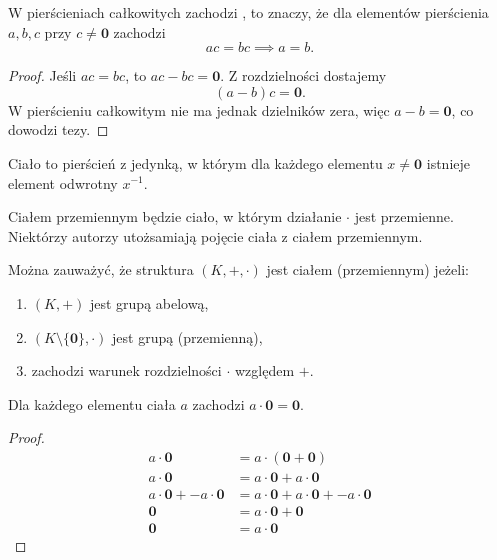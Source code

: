 \begin{lemma}
    \label{l:cancellation_property}
    W pierścieniach całkowitych zachodzi , to znaczy, że dla elementów pierścienia $a, b, c$ przy $c \neq \mathbf{0}$ zachodzi
    $$ ac = bc \implies a = b. $$
\end{lemma}
\begin{proof}
    Jeśli $ac = bc$, to $ac - bc = \mathbf{0}$. Z rozdzielności dostajemy
    $$ (a - b)c = \mathbf{0}. $$
    W pierścieniu całkowitym nie ma jednak dzielników zera, więc $a - b = \mathbf{0}$, co dowodzi tezy.
\end{proof}

\begin{definition}
    Ciało to pierścień z jedynką, w którym dla każdego elementu $x \neq \mathbf{0}$ istnieje element odwrotny $x^{-1}$.
\end{definition}

Ciałem przemiennym będzie ciało, w którym działanie $\cdot$ jest przemienne. Niektórzy autorzy utożsamiają pojęcie ciała z ciałem przemiennym.

Można zauważyć, że struktura $(K, +, \cdot)$ jest ciałem (przemiennym) jeżeli:
\begin{enumerate}
    \item $(K, +)$ jest grupą abelową,
    \item $(K \setminus \{\mathbf{0}\}, \cdot)$ jest grupą (przemienną),
    \item zachodzi warunek rozdzielności $\cdot$ względem $+$.
\end{enumerate}

\begin{lemma}
    \label{l:a0=0}
    Dla każdego elementu ciała $a$ zachodzi $a \cdot \mathbf{0} = \mathbf{0}$.
\end{lemma}
\begin{proof}
    \begin{align*}             a \cdot \mathbf{0} &= a \cdot (\mathbf{0} + \mathbf{0}) \\
                               a \cdot \mathbf{0} &= a \cdot \mathbf{0} + a \cdot \mathbf{0} \\
        a \cdot \mathbf{0} + - a \cdot \mathbf{0} &= a \cdot \mathbf{0} + a \cdot \mathbf{0} + - a \cdot \mathbf{0} \\
                                       \mathbf{0} &= a \cdot \mathbf{0} + \mathbf{0} \\
                                       \mathbf{0} &= a \cdot \mathbf{0}
    \end{align*}
\end{proof}

